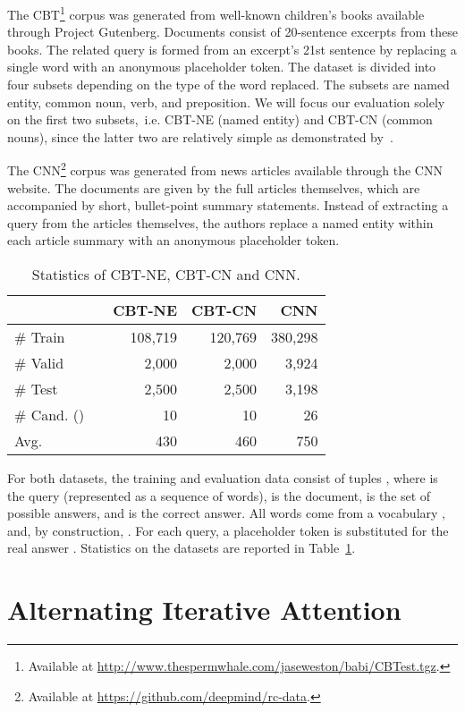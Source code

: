 \documentclass[11pt]{article}
\begin{document}
The CBT\footnote{Available at \url{http://www.thespermwhale.com/jaseweston/babi/CBTest.tgz}.} corpus was generated from well-known children's books available through Project Gutenberg. Documents consist of 20-sentence excerpts from these books. The related query is formed from an excerpt's 21st sentence by replacing a single word with an anonymous placeholder token. The dataset is divided into four subsets depending on the type of the word replaced.
The subsets are named entity, common noun, verb, and preposition. We will focus our evaluation solely on the first two subsets,~i.e. CBT-NE (named entity) and CBT-CN (common nouns), since the latter two are relatively simple as demonstrated by~\cite{hill2015goldilocks}.

The CNN\footnote{Available at \url{https://github.com/deepmind/rc-data}.} corpus was generated from news articles available through the CNN website. The documents are given by the full articles themselves, which are accompanied by short, bullet-point summary statements. Instead of extracting a query from the articles themselves, the authors replace a named entity within each article summary with an anonymous placeholder token.
\begin{table}[t]
\centering
\vspace{3mm}
\begin{tabular}{lrrrr}
\toprule
&  & CBT-NE & CBT-CN & CNN \\
\midrule
\# Train &  & 108,719 & 120,769 & 380,298      \\
\# Valid &  & 2,000    & 2,000      & 3,924    \\
\# Test  &  & 2,500    & 2,500      & 3,198    \\
\# Cand. () & & 10 & 10        & 26 \\
Avg.  && 430 & 460 & 750 \\
\bottomrule
\end{tabular}
\caption{\label{tab:stats}Statistics of CBT-NE, CBT-CN and CNN.}
\end{table}

For both datasets, the training and evaluation data consist of tuples , where  is the query (represented as a sequence of words),  is the document,  is the set of possible answers, and  is the correct answer. All words come from a vocabulary , and, by construction, . For each query, a placeholder token is substituted for the real answer . Statistics on the datasets are reported in Table~\ref{tab:stats}.
 
\section{Alternating Iterative Attention}
\end{document}
